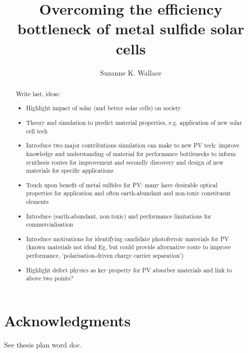 \documentclass[11pt, twoside]{report}
\title{Overcoming the efficiency bottleneck of metal sulfide solar cells}
\author{Suzanne K. Wallace}
\begin{document}
\maketitle
%

\section*{Acknowledgments}
See thesis plan word doc.


\begin{abstract}
Write last, ideas:
\begin{itemize}
\item Highlight impact of solar (and better solar cells) on society
\item Theory and simulation to predict material properties, e.g. application of new solar cell tech
\item Introduce two major contributions simulation can make to new PV tech: improve knowledge and understanding of material for performance bottlenecks to inform synthesis routes for improvement and secondly discovery and design of new materials for specific applications
\item Touch upon benefit of metal sulfides for PV: many have desirable optical properties for application and often earth-abundant and non-toxic constituent elements
\item Introduce {\CZTS} (earth-abundant, non-toxic) and performance limitations for commercialisation
\item Introduce motivations for identifying candidate photoferroic materials for PV (known materials not ideal Eg, but could provide alternative route to improve performance, `polarisation-driven charge carrier separation')
\item Highlight defect physics as key property for PV absorber materials and link to above two points?
\end{itemize}
\end{abstract}
\end{document}
